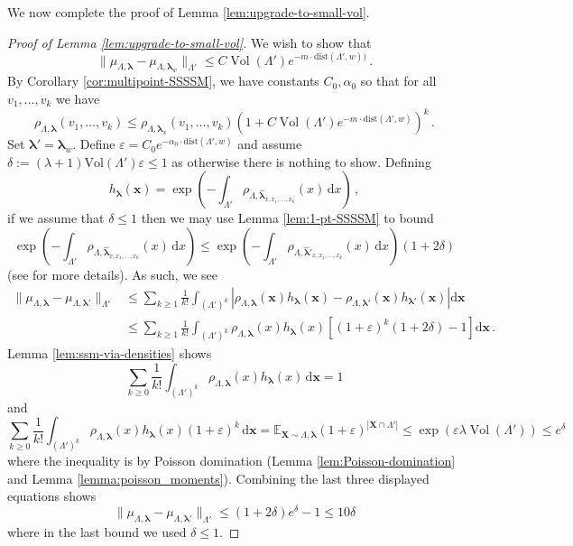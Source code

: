 \documentclass[10pt]{amsart}
\theoremstyle{definition}
\theoremstyle{remark}
\def\eps{{\varepsilon}}
\newcommand{\bX}{\mathbf{X}}
\newcommand{\Vol}{\operatorname{Vol}}
\newcommand{\blambda}{{\boldsymbol{\lambda}}}
\newcommand{\dist}{\mathrm{dist}}
\newcommand{\E}{\mathbb{E}}
\newcommand{\diff}{\mathrm{d}}
\newcommand{\vol}{\mathrm{Vol}}
\begin{document}
	We now complete the proof of Lemma \ref{lem:upgrade-to-small-vol}.
	
	
	\begin{proof}[Proof of Lemma \ref{lem:upgrade-to-small-vol}]
		We wish to show that $$\|\mu_{\Lambda,\blambda} - \mu_{\Lambda,\blambda_w}\|_{\Lambda'} \leq C \Vol(\Lambda') e^{-m \cdot\dist(\Lambda',w))}\,.$$
		By Corollary \ref{cor:multipoint-SSSSM},  we have constants $C_0, \alpha_0$ so that for all $v_1,\ldots,v_k$ we have $$ \rho_{\Lambda,\blambda}(v_1,\ldots,v_k) \leq \rho_{\Lambda,\blambda_x}(v_1,\ldots,v_k)\left( 1 + C \Vol(\Lambda') e^{-m \cdot\dist(\Lambda',w)}\right)^k\,.$$
		Set $\blambda' = \blambda_w$.   Define $\eps = C_0 e^{-\alpha_0 \cdot\dist(\Lambda',w)}$ and assume $\delta := (\lambda+1) \vol(\Lambda') \eps \leq 1$ as otherwise there is nothing to show.   Defining
		$$h_{\blambda}(\mathbf{x}) = \exp\left(-\int_{\Lambda'} \rho_{\Lambda,\widehat{\blambda}_{x,x_1,\ldots,x_k}}(x) \,\diff x \right)\,, $$
		if we assume that $\delta \leq 1$ then we may use Lemma \ref{lem:1-pt-SSSSM} to bound \begin{equation}
			\exp\left(-\int_{\Lambda'} \rho_{\Lambda,\widehat{\blambda}_{x,x_1,\ldots,x_k}}(x) \,\diff x \right) \leq \exp\left(-\int_{\Lambda'} \rho_{\Lambda,\widehat{\blambda}'_{x,x_1,\ldots,x_k}}(x) \,\diff x \right)(1 + 2 \delta)
		\end{equation}
		(see \cite[Corollary 16]{michelen2022strong} for more details).  
		As such, we see \begin{align*}
			\|\mu_{\Lambda,\blambda} - \mu_{\Lambda,\blambda'}\|_{\Lambda'} &\leq \sum_{k \geq 1} \frac{1}{k!} \int_{(\Lambda')^k} |\rho_{\Lambda,\blambda}(\mathbf{x}) h_{\blambda}(\mathbf{x}) - \rho_{\Lambda,\blambda'}(\mathbf{x}) h_{\blambda'}(\mathbf{x})| \diff \mathbf{x}  \\
			&\leq \sum_{k \geq 1} \frac{1}{k!} \int_{(\Lambda')^k} \rho_{\Lambda,\blambda}(x) h_{\blambda}(x) \left[(1 + \eps)^k(1 + 2\delta) - 1 \right] \diff \mathbf{x} \,.
		\end{align*}
		Lemma \ref{lem:ssm-via-densities} shows $$\sum_{k \geq 0} \frac{1}{k!} \int_{(\Lambda')^k} \rho_{\Lambda,\blambda}(x) h_{\blambda}(x) \, \diff \mathbf{x} = 1$$ 
		and $$\sum_{k \geq 0} \frac{1}{k!} \int_{(\Lambda')^k} \rho_{\Lambda,\blambda}(x) h_{\blambda}(x) (1 + \eps)^k \, \diff \mathbf{x} = \E_{\bX \sim \Lambda,\blambda} (1 + \eps)^{|\bX \cap \Lambda'|} \leq \exp\left( \eps \lambda \Vol(\Lambda') \right) \leq e^{\delta}$$
		where the inequality is by Poisson domination (Lemma \ref{lem:Poisson-domination} and Lemma \ref{lemma:poisson_moments}). 
		Combining the last three displayed equations shows 
		$$\|\mu_{\Lambda,\blambda} - \mu_{\Lambda,\blambda'}\|_{\Lambda'} \leq (1 + 2\delta) e^{\delta} - 1 \leq 10 \delta$$
		where in the last bound we used $\delta \leq 1$. 
	\end{proof}
	
\end{document}
